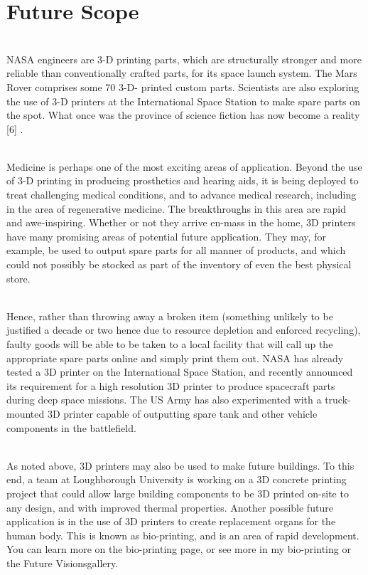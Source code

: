 \documentclass[12pt,a4paper]{report}
\begin{document}
	\par
	\chapter{Future Scope}
	\noindent
	\\NASA engineers are 3-D printing parts, which are structurally stronger and more reliable than
	conventionally crafted parts, for its space launch system. The Mars Rover comprises some 70 3-D-
	printed custom parts. Scientists are also exploring the use of 3-D printers at the International Space
	Station to make spare parts on the spot. What once was the province of science fiction has now
	become a reality [6] .\par
	\noindent
	\\
	Medicine is perhaps one of the most exciting areas of application. Beyond the use of 3-D
	printing in producing prosthetics and hearing aids, it is being deployed to treat challenging medical
	conditions, and to advance medical research, including in the area of regenerative medicine. The
	breakthroughs in this area are rapid and awe-inspiring. Whether or not they arrive en-mass in the
	home, 3D printers have many promising areas of potential future application. They may, for
	example, be used to output spare parts for all manner of products, and which could not possibly be
	stocked as part of the inventory of even the best physical store.\par
	
	\noindent
	\\Hence, rather than throwing away a broken item (something unlikely to be justified a decade
	or two hence due to resource depletion and enforced recycling), faulty goods will be able to be
	taken to a local facility that will call up the appropriate spare parts online and simply print them out.
	NASA has already tested a 3D printer on the International Space Station, and recently announced its
	requirement for a high resolution 3D printer to produce spacecraft parts during deep space missions.
	The US Army has also experimented with a truck-mounted 3D printer capable of outputting spare
	tank and other vehicle components in the battlefield.\par
	
	\noindent
	\\As noted above, 3D printers may also be used to make future buildings. To this end, a team at
	Loughborough University is working on a 3D concrete printing project that could allow large
	building components to be 3D printed on-site to any design, and with improved thermal properties.
	Another possible future application is in the use of 3D printers to create replacement organs for the
	human body. This is known as bio-printing, and is an area of rapid development. You can learn
	more on the bio-printing page, or see more in my bio-printing or the Future Visionsgallery.\par
	
\end{document}
